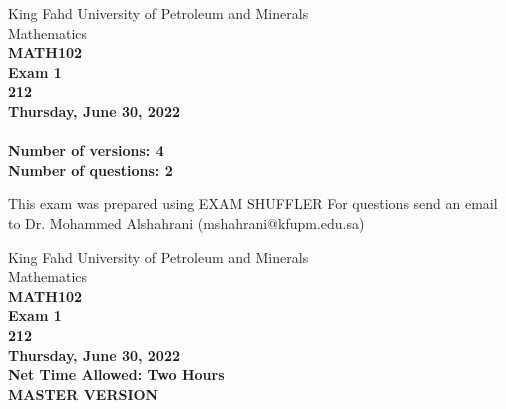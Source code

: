 \documentclass[amsfonts,bezier,leqno,fleqn,12pt,a4paper]{article}
\begin{document}
\thispagestyle{empty}
\begin{center}
    \begin{large}
        King Fahd University of Petroleum and Minerals\\ 
        Mathematics \\ 
        \vspace*{2cm}
        {\bf MATH102 }  \\
        {\bf Exam 1 }  \\
        {\bf 212 }  \\
        {\bf Thursday, June 30, 2022 }  \\ 

        \vspace*{3cm}
        {\bf{\Huge{}}}\\
        \vspace*{2cm}
        {\bf Number of versions: 4 }  \\
        {\bf Number of questions: 2 }  \\
        \vspace*{0.2cm}
    \end{large}

    \vfill

    \tiny{This exam was prepared using EXAM SHUFFLER}
    \tiny{For questions send an email to Dr. Mohammed Alshahrani (mshahrani@kfupm.edu.sa) }
\end{center}

\newpage



\thispagestyle{empty}
\begin{center}
    \begin{large}
        King Fahd University of Petroleum and Minerals \\
        Mathematics  \\
        {\bf MATH102 } \\ 
        {\bf Exam 1  } \\
        {\bf  212 }  \\
        {\bf Thursday, June 30, 2022 }  \\ 
        {\bf Net Time Allowed: Two Hours }  \\
        \vspace*{6cm}
        {\bf {\Huge{MASTER VERSION}}}  \\
    \end{large}
\end{center}
\end{document}
